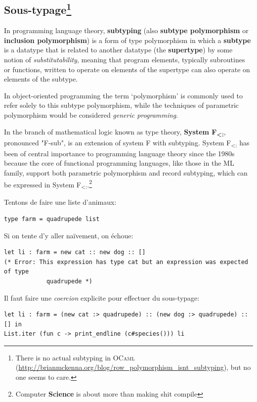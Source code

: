 \documentclass[a4paper]{article}
\begin{document}
\subsection{Sous-typage\protect\footnote{There is no actual subtyping in
\textsc{OCaml}
(\protect\url{http://brianmckenna.org/blog/row\_polymorphism\_isnt\_subtyping}), but no one
seems to care.}}

In programming language theory, \textbf{subtyping} (also \textbf{subtype
polymorphism} or
\textbf{inclusion polymorphism}) is a form of type polymorphism in which a
\textbf{subtype} is a
datatype that is related to another datatype (the \textbf{supertype}) by some
notion of \textit{substitutability}, meaning that program elements, typically
subroutines or functions, written to operate on elements of the supertype can
also operate on elements of the subtype.

In object-oriented programming the term `polymorphism' is commonly used to
refer solely to this subtype polymorphism, while the techniques of parametric
polymorphism would be considered \textit{generic programming}.

In the branch of mathematical logic known as type theory, \textbf{System
F\textsubscript{<:}},
pronounced "F-sub", is an extension of system F with subtyping. System
F\textsubscript{<:} has
been of central importance to programming language theory since the 1980s
because the core of functional programming languages, like those in the ML
family, support both parametric polymorphism and record subtyping, which can be
expressed in System F\textsubscript{<:}.\footnote{Computer \textbf{Science} is
about more than making shit compile}

\newpage

Tentons de faire une liste d'animaux:

\begin{verbatim}
type farm = quadrupede list
\end{verbatim}

Si on tente d'y aller naïvement, on échoue:

\begin{verbatim}
let li : farm = new cat :: new dog :: []
(* Error: This expression has type cat but an expression was expected of type
            quadrupede *)
\end{verbatim}

Il faut faire une \textit{coercion} explicite pour effectuer du sous-typage:

\begin{verbatim}
let li : farm = (new cat :> quadrupede) :: (new dog :> quadrupede) :: [] in
List.iter (fun c -> print_endline (c#species())) li
\end{verbatim}
\end{document}
